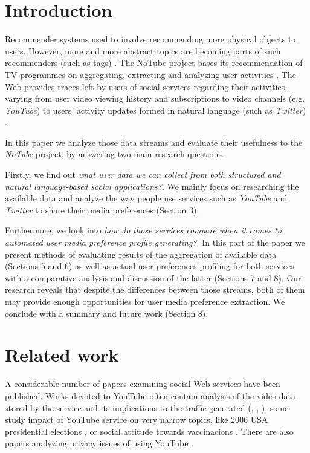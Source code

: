 \section{Introduction}

Recommender systems used to involve recommending more physical objects \cite{combining-cf-with-pa} to users.
However, more and more abstract topics are becoming parts of such recommenders (such as tags) \cite{accuracy-recommending}. The NoTube project bases its recommendation of TV programmes on aggregating,
extracting and analyzing user activities \cite{notube-main}. The Web provides traces left by users
of social services regarding their activities, varying from user video viewing history
and subscriptions to video channels (e.g. \textit{YouTube})
to users' activity updates formed in natural language (such as \textit{Twitter}) \cite{why-we-twitter}.

In this paper we analyze those data streams and evaluate their usefulness to the \textit{NoTube}
project, by answering two main research questions.

Firstly, we find out \textit{what user data we can collect from both structured and natural language-based social applications?}. We mainly focus on researching the available data and analyze the way people use services such as
\textit{YouTube} and \textit{Twitter} to share their media preferences (Section 3).

Furthermore, we look into \textit{how do those services compare when it comes to automated user media
preference profile generating?}. In this part of the paper we present methods of evaluating results of
the aggregation of available data (Sections 5 and 6) as well as actual user preferences profiling for both
services with a comparative analysis and discussion of the latter (Sections 7 and 8). Our research reveals that despite the
differences between those streams, both of them may provide enough opportunities for user media preference
extraction. We conclude with a summary and future work (Section 8).

\section{Related work}

A considerable number of papers examining social Web services have been
published. Works devoted to YouTube often contain analysis of the video data
stored by the service and its implications to the traffic generated
(\cite{i-tube-you-tube}, \cite{views-from-the-edge},
\cite{statistics-and-social-network}), some study impact of YouTube service on
very narrow topics, like 2006 USA presidential elections
\cite{voters-myspace-youtube}, or social attitude towards vaccinacions
\cite{keelan}. There are also papers analyzing privacy issues of using YouTube
\cite{publicly-private}.

